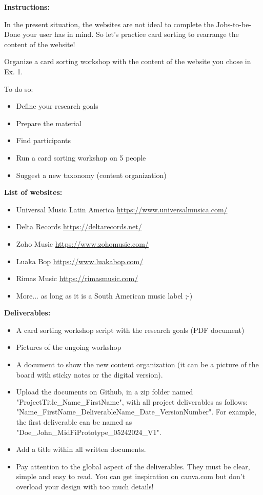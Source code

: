\makeheaderfiles

\textbf{Instructions:}

In the present situation, the websites are not ideal to complete the Jobs-to-be-Done your user has in mind. So let's practice card sorting to rearrange the content of the website!

Organize a card sorting workshop with the content of the website you chose in Ex. 1.

To do so:

\begin{itemize}
\item Define your research goals
\item Prepare the material
\item Find participants
\item Run a card sorting workshop on 5 people
\item Suggest a new taxonomy (content organization)
\end{itemize}

\textbf{List of websites:}

\begin{itemize}
\item Universal Music Latin America \url{https://www.universalmusica.com/}
\item Delta Records \url{https://deltarecords.net/}
\item Zoho Music \url{https://www.zohomusic.com/}
\item Luaka Bop \url{https://www.luakabop.com/}
\item Rimas Music \url{https://rimasmusic.com/}
\item More... as long as it is a South American music label ;-)
\end{itemize}

\textbf{Deliverables:}

\begin{itemize}
\item A card sorting workshop script with the research goals (PDF document)
\item Pictures of the ongoing workshop
\item A document to show the new content organization (it can be a picture of the board with sticky notes or the digital version).
\item Upload the documents on Github, in a zip folder named "ProjectTitle\_Name\_FirstName", with all project deliverables as follows: "Name\_FirstName\_DeliverableName\_Date\_VersionNumber".  For example, the first deliverable can be named as "Doe\_John\_MidFiPrototype\_05242024\_V1".
\item Add a title within all written documents.
\item Pay attention to the global aspect of the deliverables. They must be clear, simple and easy to read. You can get inspiration on canva.com but don't overload your design with too much details!
\end{itemize}

